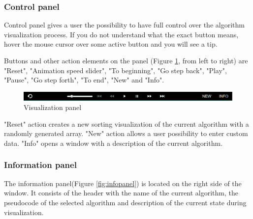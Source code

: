 \documentclass[
  field=inf,
  biblatex,
  language=english,
  glossaries,
  theorems=false,
  index
]{kidiplom}
\begin{document}
\subsubsection{Control panel}

Control panel gives a user the possibility to have full control over the algorithm visualization process. If you do not understand what the exact button means, hover the mouse cursor over some active button and you will see a tip.

Buttons and other action elements on the panel (Figure \ref{fig:controls}, from left to right) are "Reset", "Animation speed slider", "To beginning", "Go step back", "Play", "Pause", "Go step forth", "To end", "New" and "Info".

\begin{figure}[H]
\begin{center}
	\includegraphics[scale=0.5]{img/ui/Controls.png}
	\caption{Visualization panel}\label{fig:controls}
\end{center}
\end{figure}

"Reset" action creates a new sorting visualization of the current algorithm with a randomly generated array. "New" action allows a user possibility to enter custom data. "Info" opens a window with a description of the current algorithm.

\subsubsection{Information panel}

The information panel(Figure \ref{fig:infopanel}) is located on the right side of the window. It consists of the header with the name of the current algorithm, the pseudocode of the selected algorithm and description of the current state during visualization.
\end{document}
